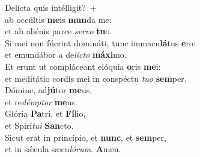 \oddverse Delícta quis intélligit?~+\\
\oddverse  ab occúltis \textbf{me}is \textbf{mun}da me:~\*\\
\oddverse et ab aliénis parce \textit{ser}\textit{vo} \textbf{tu}o.\\
\evenverse Si mei non fúerint domináti, tunc immacu\textbf{lá}tus \textbf{e}ro:~\*\\
\evenverse et emundábor a de\textit{lí}\textit{cto} \textbf{má}\textbf{xi}mo.\\
\oddverse Et erunt ut compláceant elóquia \textbf{o}ris \textbf{me}i:~\*\\
\oddverse et meditátio cordis mei in conspéctu \textit{tu}\textit{o} \textbf{sem}per.\\
\evenverse Dómine, ad\textbf{jú}tor \textbf{me}us,~\*\\
\evenverse et re\textit{dém}\textit{ptor} \textbf{me}us.\\
\oddverse Glória \textbf{Pa}tri, et \textbf{Fí}lio,~\*\\
\oddverse et Spirí\textit{tu}\textit{i} \textbf{San}cto.\\
\evenverse Sicut erat in princípio, et \textbf{nunc}, et \textbf{sem}per,~\*\\
\evenverse et in sǽcula sæcu\textit{ló}\textit{rum}. \textbf{A}men.\\
